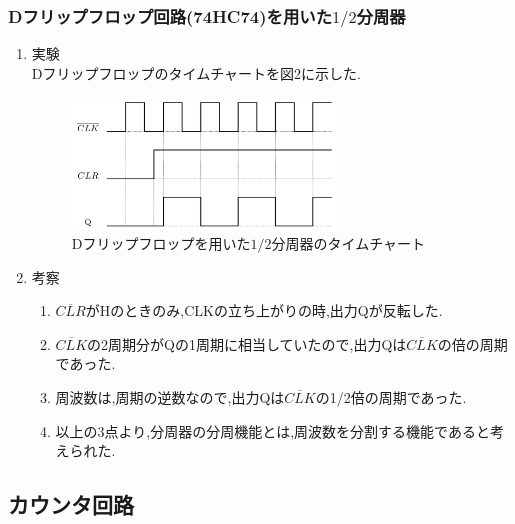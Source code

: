 \documentclass[twocolumn, 10pt,a4j]{jsarticle}
\begin{document}
    \subsubsection{Dフリップフロップ回路(74HC74)を用いた$1/2$分周器}
      \begin{enumerate}
        \item 実験 \\
          Dフリップフロップのタイムチャートを図2に示した.
            \begin{figure}[H]
              \begin{center}
                \includegraphics[width=7cm]{../img/junjokairo/d-ff_time_chart.png}
                \caption{Dフリップフロップを用いた$1/2$分周器のタイムチャート}
              \end{center}
            \end{figure}
        \item 考察 \\
          \begin{enumerate}
            \item $\overline{CLR}$がHのときのみ,CLKの立ち上がりの時,出力Qが反転した.
            \item $\overline{CLK}$の2周期分がQの1周期に相当していたので,出力Qは$\overline{CLK}$の倍の周期であった.
            \item 周波数は,周期の逆数なので,出力Qは$\overline{CLK}$の1/2倍の周期であった.
            \item 以上の3点より,分周器の分周機能とは,周波数を分割する機能であると考えられた.

          \end{enumerate}
      \end{enumerate}
  \subsection{カウンタ回路}
\end{document}
